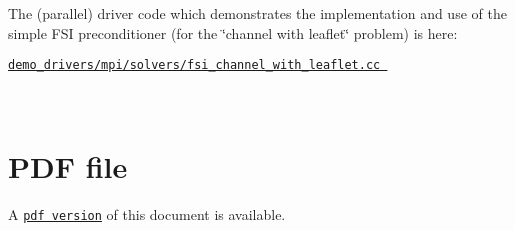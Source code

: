 \begin{DoxyItemize}
\item The (parallel) driver code which demonstrates the implementation and use of the simple F\+SI preconditioner (for the \char`\"{}channel with leaflet\char`\"{} problem) is here\+: \begin{center} \href{../../../../demo_drivers/mpi/solvers/fsi_channel_with_leaflet.cc}{\tt demo\+\_\+drivers/mpi/solvers/fsi\+\_\+channel\+\_\+with\+\_\+leaflet.\+cc } \end{center}  ~\newline

\end{DoxyItemize}



 

 \hypertarget{index_pdf}{}\section{P\+D\+F file}\label{index_pdf}
A \href{../latex/refman.pdf}{\tt pdf version} of this document is available. 
